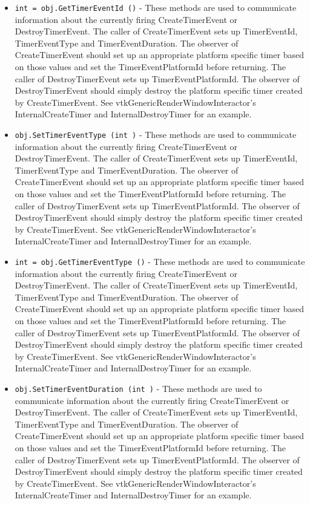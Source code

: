 \begin{itemize}
\item  \verb|int = obj.GetTimerEventId ()| -  These methods are used to communicate information about the currently
 firing CreateTimerEvent or DestroyTimerEvent. The caller of
 CreateTimerEvent sets up TimerEventId, TimerEventType and
 TimerEventDuration. The observer of CreateTimerEvent should set up an
 appropriate platform specific timer based on those values and set the
 TimerEventPlatformId before returning. The caller of DestroyTimerEvent
 sets up TimerEventPlatformId. The observer of DestroyTimerEvent should
 simply destroy the platform specific timer created by CreateTimerEvent.
 See vtkGenericRenderWindowInteractor's InternalCreateTimer and
 InternalDestroyTimer for an example.

\item  \verb|obj.SetTimerEventType (int )| -  These methods are used to communicate information about the currently
 firing CreateTimerEvent or DestroyTimerEvent. The caller of
 CreateTimerEvent sets up TimerEventId, TimerEventType and
 TimerEventDuration. The observer of CreateTimerEvent should set up an
 appropriate platform specific timer based on those values and set the
 TimerEventPlatformId before returning. The caller of DestroyTimerEvent
 sets up TimerEventPlatformId. The observer of DestroyTimerEvent should
 simply destroy the platform specific timer created by CreateTimerEvent.
 See vtkGenericRenderWindowInteractor's InternalCreateTimer and
 InternalDestroyTimer for an example.

\item  \verb|int = obj.GetTimerEventType ()| -  These methods are used to communicate information about the currently
 firing CreateTimerEvent or DestroyTimerEvent. The caller of
 CreateTimerEvent sets up TimerEventId, TimerEventType and
 TimerEventDuration. The observer of CreateTimerEvent should set up an
 appropriate platform specific timer based on those values and set the
 TimerEventPlatformId before returning. The caller of DestroyTimerEvent
 sets up TimerEventPlatformId. The observer of DestroyTimerEvent should
 simply destroy the platform specific timer created by CreateTimerEvent.
 See vtkGenericRenderWindowInteractor's InternalCreateTimer and
 InternalDestroyTimer for an example.

\item  \verb|obj.SetTimerEventDuration (int )| -  These methods are used to communicate information about the currently
 firing CreateTimerEvent or DestroyTimerEvent. The caller of
 CreateTimerEvent sets up TimerEventId, TimerEventType and
 TimerEventDuration. The observer of CreateTimerEvent should set up an
 appropriate platform specific timer based on those values and set the
 TimerEventPlatformId before returning. The caller of DestroyTimerEvent
 sets up TimerEventPlatformId. The observer of DestroyTimerEvent should
 simply destroy the platform specific timer created by CreateTimerEvent.
 See vtkGenericRenderWindowInteractor's InternalCreateTimer and
 InternalDestroyTimer for an example.


\end{itemize}
